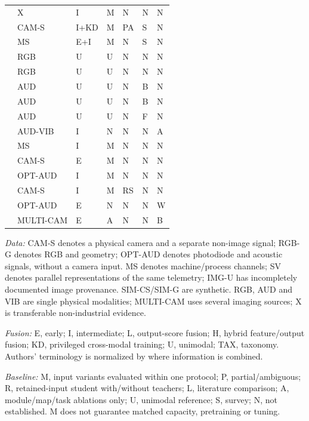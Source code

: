 \begin{longtable}{@{}p{}llllll@{}}
\citep{Wang2020What} & X & I & M & N & N & N \\
\citep{Xie2025Audiovisual} & CAM-S & I+KD & M & PA & S & N \\
\citep{Goodarzi2023Deep} & MS & E+I & M & N & S & N \\
\citep{Roth2022Towards} & RGB & U & U & N & N & N \\
\citep{Bergmann2019MVTec} & RGB & U & U & N & N & N \\
\citep{Purohit2019MIMII} & AUD & U & U & N & B & N \\
\citep{Koizumi2019ToyADMOS} & AUD & U & U & N & B & N \\
\citep{Koizumi2020Description} & AUD & U & U & N & F & N \\
\citep{Chu2024A} & AUD-VIB & I & N & N & N & A \\
\citep{Kullu2022A} & MS & I & M & N & N & N \\
\citep{Chen2023Multisensor} & CAM-S & E & M & N & N & N \\
\citep{Li2022A} & OPT-AUD & I & M & N & N & N \\
\citep{Petrich2021Multimodal} & CAM-S & I & M & RS & N & N \\
\citep{Pandiyan2022Deep} & OPT-AUD & E & N & N & N & W \\
\citep{Bevans2023Heterogeneous} & MULTI-CAM & E & A & N & N & B \\
\bottomrule
\end{longtable}
\noindent\textit{Data:} CAM-S denotes a physical camera and a separate non-image signal; RGB-G denotes RGB and geometry; OPT-AUD denotes photodiode and acoustic signals, without a camera input. MS denotes machine/process channels; SV denotes parallel representations of the same telemetry; IMG-U has incompletely documented image provenance. SIM-CS/SIM-G are synthetic. RGB, AUD and VIB are single physical modalities; MULTI-CAM uses several imaging sources; X is transferable non-industrial evidence.
\par\noindent\textit{Fusion:} E, early; I, intermediate; L, output-score fusion; H, hybrid feature/output fusion; KD, privileged cross-modal training; U, unimodal; TAX, taxonomy. Authors' terminology is normalized by where information is combined.
\par\noindent\textit{Baseline:} M, input variants evaluated within one protocol; P, partial/ambiguous; R, retained-input student with/without teachers; L, literature comparison; A, module/map/task ablations only; U, unimodal reference; S, survey; N, not established. M does not guarantee matched capacity, pretraining or tuning.
